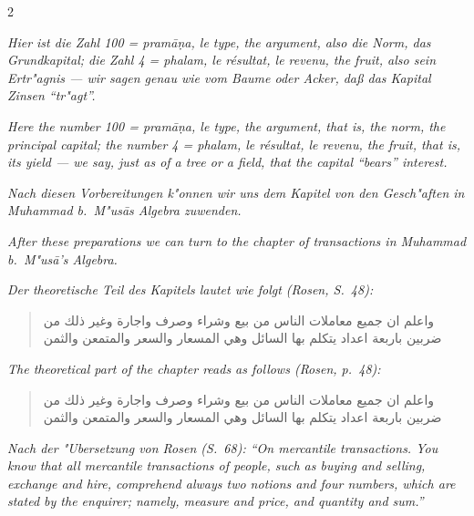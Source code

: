 \documentclass[10pt,a4paper]{article}
\newcommand{\RL}[1]{\beginR#1\endR}
\newcommand{\ar}[1]{{\arabicfont\RL{#1}}}
\newcommand{\enquote}[1]{``#1''}
\begin{document}
\begin{paracol}{2}
\switchcolumn*

\textit{Hier ist die Zahl 100 = \textit{pram\=a\d{n}a}, \textit{le type}, \textit{the argument}, also die Norm, das Grundkapital; die Zahl 4 = \textit{phalam}, \textit{le r\'esultat}, \textit{le revenu}, \textit{the fruit}, also sein Ertr"agnis --- wir sagen genau wie vom Baume oder Acker, da\ss{} das Kapital Zinsen \enquote{tr"agt}.}

\switchcolumn

\textit{Here the number 100 = \textit{pram\=a\d{n}a}, \textit{le type}, \textit{the argument}, that is, the norm, the principal capital; the number 4 = \textit{phalam}, \textit{le r\'esultat}, \textit{le revenu}, \textit{the fruit}, that is, its yield --- we say, just as of a tree or a field, that the capital \enquote{bears} interest.}

\switchcolumn*

\textit{Nach diesen Vorbereitungen k"onnen wir uns dem Kapitel von den Gesch"aften in Muhammad b.\ M"us\=as Algebra zuwenden.}

\switchcolumn

\textit{After these preparations we can turn to the chapter of transactions in Muhammad b.\ M"us\=a's Algebra.}

\switchcolumn*

\textit{Der theoretische Teil des Kapitels lautet wie folgt (Rosen, S.\ 48):}

\begin{quote}
\ar{واعلم ان جميع معاملات الناس من بيع وشراء وصرف واجارة وغير ذلك من ضربين باربعة اعداد يتكلم بها السائل وهي المسعار والسعر والمتمعن والثمن}
\end{quote}

\switchcolumn

\textit{The theoretical part of the chapter reads as follows (Rosen, p.\ 48):}

\begin{quote}
\ar{واعلم ان جميع معاملات الناس من بيع وشراء وصرف واجارة وغير ذلك من ضربين باربعة اعداد يتكلم بها السائل وهي المسعار والسعر والمتمعن والثمن}
\end{quote}

\switchcolumn*

\textit{Nach der "Ubersetzung von Rosen (S.\ 68): \enquote{On mercantile transactions. You know that all mercantile transactions of people, such as buying and selling, exchange and hire, comprehend always two notions and four numbers, which are stated by the enquirer; namely, measure and price, and quantity and sum.}}


\end{paracol}
\end{document}
